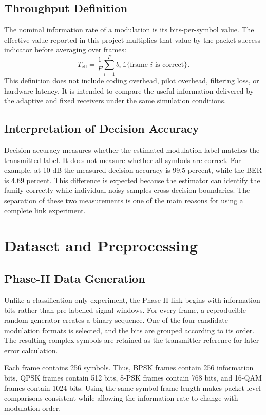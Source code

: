 \documentclass[12pt,twoside,openright]{report}
\begin{document}
\section{Throughput Definition}
The nominal information rate of a modulation is its bits-per-symbol value.
The effective value reported in this project multiplies that value by the
packet-success indicator before averaging over frames:
\begin{equation}
T_{\mathrm{eff}}=\frac{1}{F}\sum_{i=1}^{F}
b_i\,\mathbb{1}\{\text{frame }i\text{ is correct}\}.
\end{equation}
This definition does not include coding overhead, pilot overhead, filtering
loss, or hardware latency. It is intended to compare the useful information
delivered by the adaptive and fixed receivers under the same simulation
conditions.

\section{Interpretation of Decision Accuracy}
Decision accuracy measures whether the estimated modulation label matches
the transmitted label. It does not measure whether all symbols are correct.
For example, at 10 dB the measured decision accuracy is 99.5 percent, while
the BER is 4.69 percent. This difference is expected because the estimator
can identify the family correctly while individual noisy samples cross
decision boundaries. The separation of these two measurements is one of the
main reasons for using a complete link experiment.

\chapter{Dataset and Preprocessing}

\section{Phase-II Data Generation}
Unlike a classification-only experiment, the Phase-II link begins with
information bits rather than pre-labelled signal windows. For every frame,
a reproducible random generator creates a binary sequence. One of the four
candidate modulation formats is selected, and the bits are grouped according
to its order. The resulting complex symbols are retained as the transmitter
reference for later error calculation.

Each frame contains 256 symbols. Thus, BPSK frames contain 256 information
bits, QPSK frames contain 512 bits, 8-PSK frames contain 768 bits, and
16-QAM frames contain 1024 bits. Using the same symbol-frame length makes
packet-level comparisons consistent while allowing the information rate to
change with modulation order.
\end{document}
